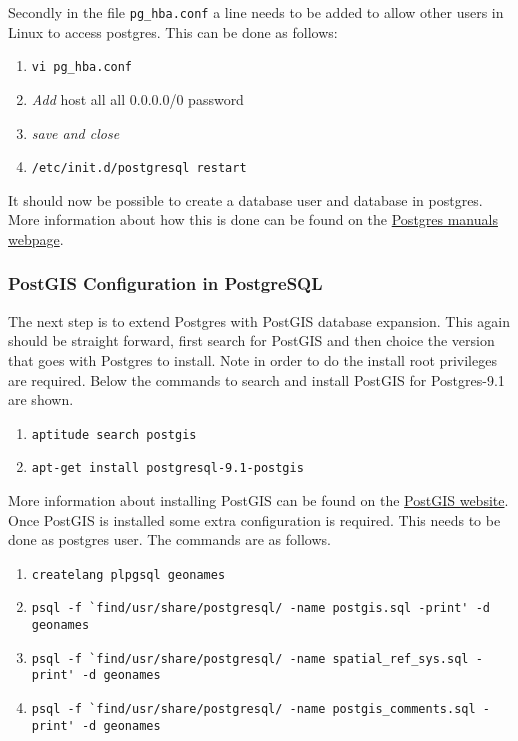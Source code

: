 \noindent Secondly in the file \lstinline|pg_hba.conf| a line needs to be added to allow other users in Linux to access postgres. This can be done as follows:

\begin{enumerate}[resume]
	\item \lstinline|vi pg_hba.conf|
	\item \textit{Add} host all	all 0.0.0.0/0 password
	\item \textit{save and close}
	\item \lstinline|/etc/init.d/postgresql restart|
\end{enumerate}

\noindent It should now be possible to create a database user and database in postgres. More information about how this is done can be found on the \href{http://www.postgresql.org/docs/manuals/}{Postgres manuals webpage}.

\subsubsection{PostGIS Configuration in PostgreSQL}
The next step is to extend Postgres with PostGIS database expansion. This again should be straight forward, first search for PostGIS and then choice the version that goes with Postgres to install. Note in order to do the install root privileges are required. Below the commands to search and install PostGIS for Postgres-9.1 are shown.

\begin{enumerate}
	\item \lstinline|aptitude search postgis|
	\item \lstinline|apt-get install postgresql-9.1-postgis|
\end{enumerate} 

\noindent More information about installing PostGIS  can be found on the \href{http://www.postgis.net/install}{PostGIS website}.
\newline
\newline
Once PostGIS is installed some extra configuration is required. This needs to be done as postgres user. The commands are as follows.

\begin{enumerate}	
	\item \lstinline|createlang plpgsql geonames|
	\item \lstinline|psql -f `find/usr/share/postgresql/ -name postgis.sql -print' -d geonames|
	\item \lstinline|psql -f `find/usr/share/postgresql/ -name spatial_ref_sys.sql -print' -d geonames|
	\item \lstinline|psql -f `find/usr/share/postgresql/ -name postgis_comments.sql -print' -d geonames|
\end{enumerate}

